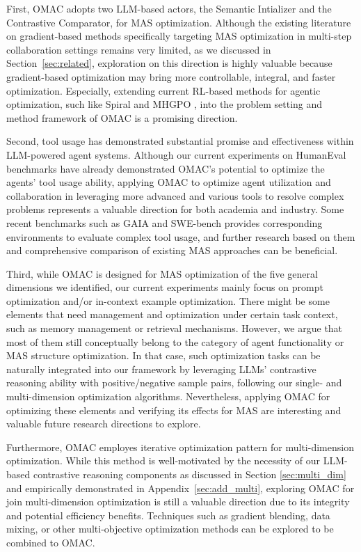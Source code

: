 First, OMAC adopts two LLM-based actors, the Semantic Intializer and the Contrastive Comparator, for MAS optimization. Although the existing literature on gradient-based methods specifically targeting MAS optimization in multi-step collaboration settings remains very limited, as we discussed in Section~\ref{sec:related}, exploration on this direction is highly valuable because gradient-based optimization may bring more controllable, integral, and faster optimization. Especially, extending current RL-based methods for agentic optimization, such like Spiral \cite{liu2025spiral} and MHGPO \cite{chen2025heterogeneous}, into the problem setting and method framework of OMAC is a promising direction.

Second, tool usage has demonstrated substantial promise and effectiveness within LLM-powered agent systems. Although our current experiments on HumanEval benchmarks have already demonstrated OMAC's potential to optimize the agents' tool usage ability, applying OMAC to optimize agent utilization and collaboration in leveraging more advanced and various tools to resolve complex problems represents a valuable direction for both academia and industry. Some recent benchmarks such as GAIA \cite{mialon2023gaia} and SWE-bench \cite{jimenez2023swe} provides corresponding environments to evaluate complex tool usage, and further research based on them and comprehensive comparison of existing MAS approaches can be beneficial.

Third, while OMAC is designed for MAS optimization of the five general dimensions we identified, our current experiments mainly focus on prompt optimization and/or in-context example optimization. There might be some elements that need management and optimization under certain task context, such as memory management or retrieval mechanisms. However, we argue that most of them still conceptually belong to the category of agent functionality or MAS structure optimization. In that case, such optimization tasks can be naturally integrated into our framework by leveraging LLMs’ contrastive reasoning ability with positive/negative sample pairs, following our single- and multi-dimension optimization algorithms. Nevertheless, applying OMAC for optimizing these elements and verifying its effects for MAS are interesting and valuable future research directions to explore.

Furthermore, OMAC employes iterative optimization pattern for multi-dimension optimization. While this method is well-motivated by the necessity of our LLM-based contrastive reasoning components as discussed in Section \ref{sec:multi_dim} and empirically demonstrated in Appendix~\ref{sec:add_multi}, exploring OMAC for join multi-dimension optimization is still a valuable direction due to its integrity and potential efficiency  benefits. Techniques such as gradient blending, data mixing, or other multi-objective optimization methods can be explored to be combined to OMAC.

